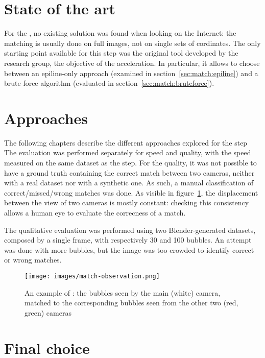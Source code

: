 \section{State of the art}

For the \match*, no existing solution was found when looking on the Internet: the matching is usually done on full images, not on single sets of cordinates.
The only starting point available for this step was the original tool developed by the research group, the objective of the acceleration.
In particular, it allows to choose between an epiline-only approach (examined in section~\ref{sec:match:epiline}) and a brute force algorithm (evaluated in section~\ref{sec:match:bruteforce}).

\section{Approaches}

The following chapters describe the different approaches explored for the \match* step
The evaluation was performed separately for speed and quality, with the speed measured on the same dataset as the \linkDD* step.
For the quality, it was not possible to have a ground truth containing the correct match between two cameras, neither with a real dataset nor with a synthetic one.
As such, a manual classification of correct/missed/wrong matches was done.
As visible in figure~\ref{fig:match:example}, the displacement between the view of two cameras is mostly constant: checking this consistency allows a human eye to evaluate the correcness of a match.

The qualitative evaluation was performed using two Blender-generated datasets, composed by a single frame, with respectively 30 and 100 bubbles.
An attempt was done with more bubbles, but the image was too crowded to identify correct or wrong matches.

\begin{figure}[H]
	\centerline{\texttt{[image: images/match-observation.png]}}
	\caption{\centering An example of \match*: the bubbles seen by the main (white) camera, matched to the corresponding bubbles seen from the other two (red, green) cameras}
	\label{fig:match:example}
\end{figure}

\newpage
 \newpage
 \newpage
 \newpage
 \newpage
 \newpage
 \newpage
 \newpage

\section{Final choice}
